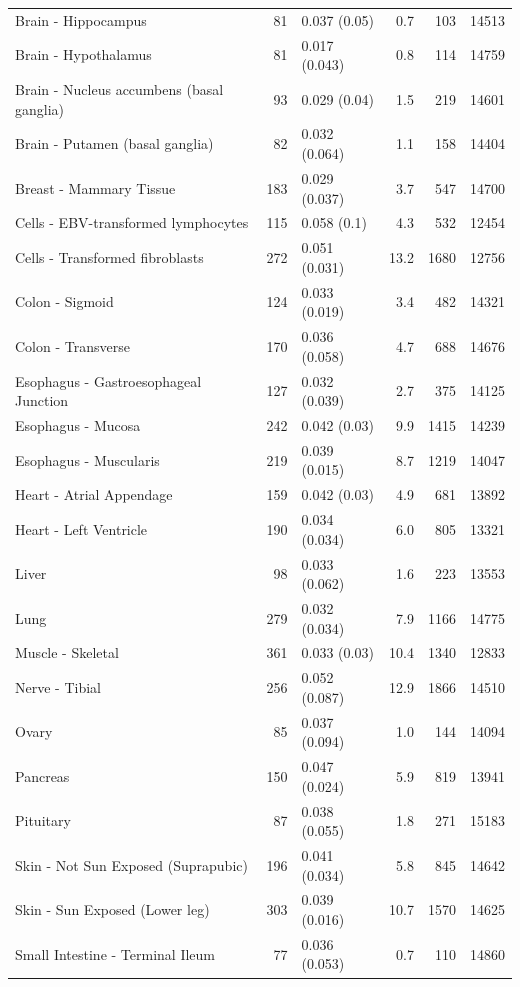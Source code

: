 \documentclass[10pt,letterpaper]{article}
\begin{document}
\begin{table}[!ht]
\begin{adjustwidth}{-2.25in}{0in}
\begin{tabular}{lrlrrr}
  Brain - Hippocampus & 81 & 0.037 (0.05) & 0.7 & 103 & 14513 \\ 
  Brain - Hypothalamus & 81 & 0.017 (0.043) & 0.8 & 114 & 14759 \\ 
  Brain - Nucleus accumbens (basal ganglia) & 93 & 0.029 (0.04) & 1.5 & 219 & 14601 \\ 
  Brain - Putamen (basal ganglia) & 82 & 0.032 (0.064) & 1.1 & 158 & 14404 \\ 
  Breast - Mammary Tissue & 183 & 0.029 (0.037) & 3.7 & 547 & 14700 \\ 
  Cells - EBV-transformed lymphocytes & 115 & 0.058 (0.1) & 4.3 & 532 & 12454 \\ 
  Cells - Transformed fibroblasts & 272 & 0.051 (0.031) & 13.2 & 1680 & 12756 \\ 
  Colon - Sigmoid & 124 & 0.033 (0.019) & 3.4 & 482 & 14321 \\ 
  Colon - Transverse & 170 & 0.036 (0.058) & 4.7 & 688 & 14676 \\ 
  Esophagus - Gastroesophageal Junction & 127 & 0.032 (0.039) & 2.7 & 375 & 14125 \\ 
  Esophagus - Mucosa & 242 & 0.042 (0.03) & 9.9 & 1415 & 14239 \\ 
  Esophagus - Muscularis & 219 & 0.039 (0.015) & 8.7 & 1219 & 14047 \\ 
  Heart - Atrial Appendage & 159 & 0.042 (0.03) & 4.9 & 681 & 13892 \\ 
  Heart - Left Ventricle & 190 & 0.034 (0.034) & 6.0 & 805 & 13321 \\ 
  Liver & 98 & 0.033 (0.062) & 1.6 & 223 & 13553 \\ 
  Lung & 279 & 0.032 (0.034) & 7.9 & 1166 & 14775 \\ 
  Muscle - Skeletal & 361 & 0.033 (0.03) & 10.4 & 1340 & 12833 \\ 
  Nerve - Tibial & 256 & 0.052 (0.087) & 12.9 & 1866 & 14510 \\ 
  Ovary & 85 & 0.037 (0.094) & 1.0 & 144 & 14094 \\ 
  Pancreas & 150 & 0.047 (0.024) & 5.9 & 819 & 13941 \\ 
  Pituitary & 87 & 0.038 (0.055) & 1.8 & 271 & 15183 \\ 
  Skin - Not Sun Exposed (Suprapubic) & 196 & 0.041 (0.034) & 5.8 & 845 & 14642 \\ 
  Skin - Sun Exposed (Lower leg) & 303 & 0.039 (0.016) & 10.7 & 1570 & 14625 \\ 
  Small Intestine - Terminal Ileum & 77 & 0.036 (0.053) & 0.7 & 110 & 14860 \\ 

\end{tabular}
\end{adjustwidth}
\end{table}
\end{document}
